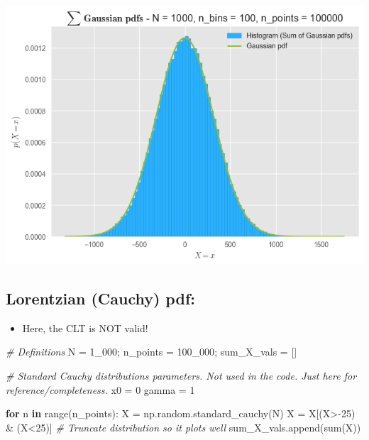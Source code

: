 \documentclass[
]{article}
\newenvironment{Shaded}{}{}
\newcommand{\BuiltInTok}[1]{\textcolor[rgb]{0.00,0.50,0.00}{#1}}
\newcommand{\CommentTok}[1]{\textcolor[rgb]{0.38,0.63,0.69}{\textit{#1}}}
\newcommand{\ControlFlowTok}[1]{\textcolor[rgb]{0.00,0.44,0.13}{\textbf{#1}}}
\newcommand{\DecValTok}[1]{\textcolor[rgb]{0.25,0.63,0.44}{#1}}
\newcommand{\KeywordTok}[1]{\textcolor[rgb]{0.00,0.44,0.13}{\textbf{#1}}}
\newcommand{\NormalTok}[1]{#1}
\newcommand{\OperatorTok}[1]{\textcolor[rgb]{0.40,0.40,0.40}{#1}}
\providecommand{\tightlist}{%
  \setlength{\itemsep}{0pt}\setlength{\parskip}{0pt}}
\begin{document}
\includegraphics{vertopal_6d63c4420d4a47a4b64ec714b34abd06/3f50c84c72e85eb0d1af129acc1b3cd52b033a94.png}

\hypertarget{lorentzian-cauchy-pdf}{%
\subsection{Lorentzian (Cauchy) pdf:}\label{lorentzian-cauchy-pdf}}

\begin{itemize}
\tightlist
\item
  Here, the CLT is NOT valid!
\end{itemize}

\begin{Shaded}
\begin{Highlighting}[]
\CommentTok{\# Definitions}
\NormalTok{N }\OperatorTok{=} \DecValTok{1\_000}\OperatorTok{;}\NormalTok{ n\_points }\OperatorTok{=} \DecValTok{100\_000}\OperatorTok{;}\NormalTok{ sum\_X\_vals }\OperatorTok{=}\NormalTok{ []}

\CommentTok{\# Standard Cauchy distribution\textquotesingle{}s parameters. Not used in the code. Just here for reference/completeness.}
\NormalTok{x0    }\OperatorTok{=} \DecValTok{0}
\NormalTok{gamma }\OperatorTok{=} \DecValTok{1}

\ControlFlowTok{for}\NormalTok{ n }\KeywordTok{in} \BuiltInTok{range}\NormalTok{(n\_points):}
\NormalTok{    X }\OperatorTok{=}\NormalTok{ np.random.standard\_cauchy(N)}
\NormalTok{    X }\OperatorTok{=}\NormalTok{ X[(X}\OperatorTok{\textgreater{}{-}}\DecValTok{25}\NormalTok{) }\OperatorTok{\&}\NormalTok{ (X}\OperatorTok{\textless{}}\DecValTok{25}\NormalTok{)] }\CommentTok{\# Truncate distribution so it plots well}
\NormalTok{    sum\_X\_vals.append(}\BuiltInTok{sum}\NormalTok{(X))}
\end{Highlighting}
\end{Shaded}
\end{document}
